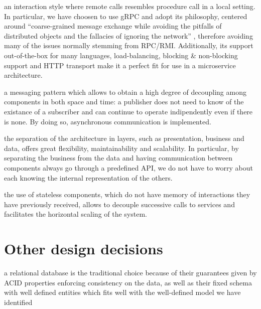 \begin{description}[leftmargin=0pt]
    \item[RPC:] an interaction style where remote calls resembles procedure call in a local setting. In particular, we have
          choosen to use gRPC and adopt its philosophy, centered around ``coarse-grained message exchange while avoiding the
          pitfalls of distributed objects and the fallacies of ignoring the network'' \cite{gRPCPrinciples}, therefore
          avoiding many of the issues normally stemming from RPC/RMI. Additionally, its support out-of-the-box for many
          languages, load-balancing, blocking \& non-blocking support and HTTP transport make it a perfect fit for use in a
          microservice architecture.
    \item[Pub-sub/Message queueing:] a messaging pattern which allows to obtain a high degree of decoupling among components
          in both space and time: a publisher does not need to know of the existance of a subscriber and can continue to
          operate indipendently even if there is none. By doing so, asynchronous communication is implemented.
    \item[Tiered architecture:] the separation of the architecture in layers, such as presentation, business and data,
          offers great flexibility, maintainability and scalability. In particular, by separating the business from the data
          and having communication between components always go through a predefined API, we do not have to worry about
          each knowing the internal representation of the others.
    \item[Stateless components:] the use of stateless components, which do not have memory of interactions they have previously
          received, allows to decouple successive calls to services and facilitates the horizontal scaling of the system.
\end{description}

\section{Other design decisions}
\begin{description}[leftmargin=0pt]
    \item[Relational DBMS:]
          a relational database is the traditional choice because of their guarantees given by ACID properties
          enforcing consistency on the data, as well as their fixed schema with well defined entities which fits
          well with the well-defined model we have identified
\end{description}
